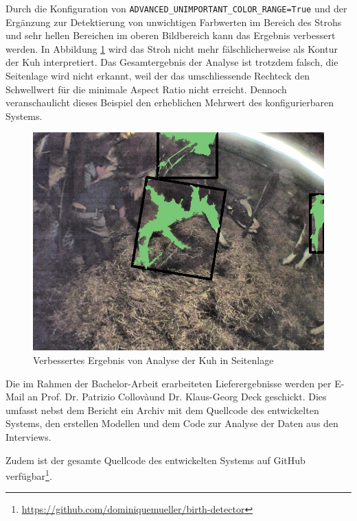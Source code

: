 Durch die Konfiguration von \texttt{ADVANCED_UNIMPORTANT_COLOR_RANGE=True} und der Ergänzung zur Detektierung von unwichtigen Farbwerten im Bereich des Strohs und sehr hellen Bereichen im oberen Bildbereich kann das Ergebnis verbessert werden. In Abbildung \ref{fig: Verbessertes Ergebnis von Analyse der Kuh in Seitenlage} wird das Stroh nicht mehr fälschlicherweise als Kontur der Kuh interpretiert. Das Gesamtergebnis der Analyse ist trotzdem falsch, die Seitenlage wird nicht erkannt, weil der das umschliessende Rechteck den Schwellwert für die minimale Aspect Ratio nicht erreicht. Dennoch veranschaulicht dieses Beispiel den erheblichen Mehrwert des konfigurierbaren Systems.

\begin{figure}[H]
	\center
	\includegraphics[scale=0.1]{Grafiken/resultate/verbessertesResultat.jpg}
	\caption{Verbessertes Ergebnis von Analyse der Kuh in Seitenlage} 
	\label{fig: Verbessertes Ergebnis von Analyse der Kuh in Seitenlage} 
\end{figure}


Die im Rahmen der Bachelor-Arbeit erarbeiteten Lieferergebnisse werden per E-Mail an Prof. Dr. Patrizio Collovàund Dr. Klaus-Georg Deck geschickt. Dies umfasst nebst dem Bericht ein Archiv mit dem Quellcode des entwickelten Systems, den erstellen Modellen und dem Code zur Analyse der Daten aus den Interviews. 

Zudem ist der gesamte Quellcode des entwickelten Systems auf GitHub verfügbar\footnote{\url{https://github.com/dominiquemueller/birth-detector}}. 
